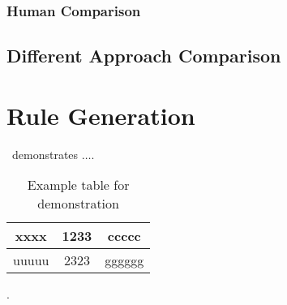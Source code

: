 \subsubsection{Human Comparison}

\subsection{Different Approach Comparison}

\section{Rule Generation}


~demonstrates $\ldots$.


\begin{table}[!ht]
	\label{Table:l1}
	\centering
	\begin{tabular}{|c|c|c|}
		\hline
		xxxx & 1233 & ccccc \\
		\hline
		uuuuu & 2323 & gggggg \\
		\hline
	\end{tabular}
	\caption{Example table for demonstration}
\end{table}

.

\begin{landscape}
\end{landscape}